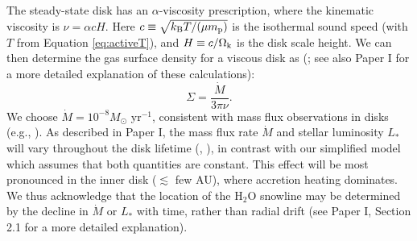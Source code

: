 \documentclass[apj]{emulateapj}
\begin{document}
The steady-state disk has an $\alpha$-viscosity prescription, where the kinematic viscosity is $\nu=\alpha c H$. Here $c \equiv \sqrt{k_{\rm B} T /(\mu m_{\rm p})}$ is the isothermal sound speed (with $T$ from Equation \ref{eq:activeT}), and $H \equiv c/\Omega_{\rm k}$ is the disk scale height. We can then determine the gas surface density for a viscous disk as (\citealt{shakura73}; see also Paper I for a more detailed explanation of these calculations):
\begin{equation}
\label{eq:Sigmaact}
\Sigma=\frac{\dot{M}}{3 \pi \nu}.
\end{equation}
We choose $\dot{M}=10^{-8} M_{\odot}$ yr$^{-1}$, consistent with mass flux observations in disks (e.g., \citealt{andrews10}). As described in Paper I, the mass flux rate $\dot{M}$ and stellar luminosity $L_*$ will vary throughout the disk lifetime (\citealt{kennedy06}, \citealt{chambers09}), in contrast with our simplified model which assumes that both quantities are constant. This effect will be most pronounced in the inner disk ($\lesssim$ few AU), where accretion heating dominates. We thus acknowledge that the location of the H$_2$O snowline may be determined by the decline in $\dot{M}$ or $L_*$ with time, rather than radial drift (see Paper I, Section 2.1 for a more detailed explanation). 

%
\end{document}
